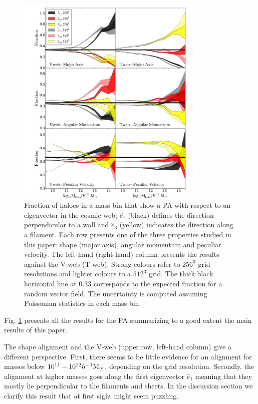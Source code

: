 \documentclass[useAMS,usenatbib]{mn2e}
\newcommand{\hMsun}{{\ifmmode{h^{-1}{\rm
        {M_{\odot}}}}\else{$h^{-1}{\rm{M_{\odot}}}$~}\fi}}
\begin{document}
\begin{figure}
\includegraphics[width=0.8\textwidth]{Fig1.pdf}
\caption{Fraction of haloes in a mass bin that show a PA with respect to an eigenvector in the cosmic
  web; $\hat{e}_1$ (black) defines the direction perpendicular to a wall and
  $\hat{e}_3$ (yellow) indicates the direction along a filament. Each row
  presents one of the three properties studied in this paper: shape (major axis),
  angular momentum and  peculiar velocity. The left-hand (right-hand) column presents the
  results against the V-web (T-web). Strong colours refer to $256^3$ grid
  resolutions and lighter colours to a $512^3$ grid. The thick black
  horizontal line at $0.33$ corresponds to the expected fraction for a
  random vector field. The uncertainty is computed assuming Poissonian
  statistics in each mass bin.
\label{fig:preferential}}
\end{figure}

Fig. \ref{fig:preferential} presents all the results for the
PA summarizing to a good extent the main
results of this paper.

The shape alignment and the V-web (upper row, left-hand column) give a
different perspective. First, there seems to be little evidence
for an alignment for masses below $10^{11}-10^{12}\hMsun$, depending
on the grid resolution. Secondly, the alignment at higher masses goes
along the first eigenvector $\hat{e}_{1}$ meaning that they mostly lie
perpendicular to the filaments and sheets. In the discussion section
we clarify this result that at first sight might seem puzzling.
\end{document}
